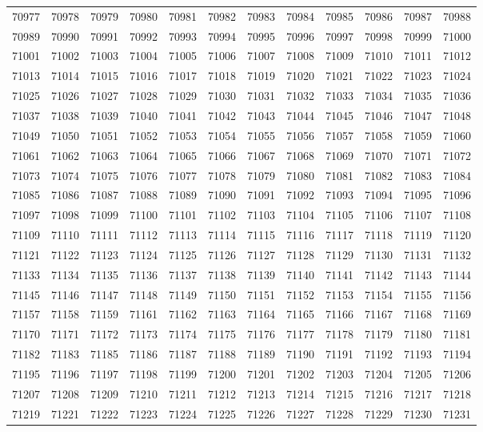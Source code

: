 \begin{center}
\begin{longtable}{llllllllllll}
70977 &70978 &70979 &70980 &70981 &70982 &70983 &70984 &70985 &70986 &70987 &70988 \\
70989 &70990 &70991 &70992 &70993 &70994 &70995 &70996 &70997 &70998 &70999 &71000 \\
71001 &71002 &71003 &71004 &71005 &71006 &71007 &71008 &71009 &71010 &71011 &71012 \\
71013 &71014 &71015 &71016 &71017 &71018 &71019 &71020 &71021 &71022 &71023 &71024 \\
71025 &71026 &71027 &71028 &71029 &71030 &71031 &71032 &71033 &71034 &71035 &71036 \\
71037 &71038 &71039 &71040 &71041 &71042 &71043 &71044 &71045 &71046 &71047 &71048 \\
71049 &71050 &71051 &71052 &71053 &71054 &71055 &71056 &71057 &71058 &71059 &71060 \\
71061 &71062 &71063 &71064 &71065 &71066 &71067 &71068 &71069 &71070 &71071 &71072 \\
71073 &71074 &71075 &71076 &71077 &71078 &71079 &71080 &71081 &71082 &71083 &71084 \\
71085 &71086 &71087 &71088 &71089 &71090 &71091 &71092 &71093 &71094 &71095 &71096 \\
71097 &71098 &71099 &71100 &71101 &71102 &71103 &71104 &71105 &71106 &71107 &71108 \\
71109 &71110 &71111 &71112 &71113 &71114 &71115 &71116 &71117 &71118 &71119 &71120 \\
71121 &71122 &71123 &71124 &71125 &71126 &71127 &71128 &71129 &71130 &71131 &71132 \\
71133 &71134 &71135 &71136 &71137 &71138 &71139 &71140 &71141 &71142 &71143 &71144 \\
71145 &71146 &71147 &71148 &71149 &71150 &71151 &71152 &71153 &71154 &71155 &71156 \\
71157 &71158 &71159 &71161 &71162 &71163 &71164 &71165 &71166 &71167 &71168 &71169 \\
71170 &71171 &71172 &71173 &71174 &71175 &71176 &71177 &71178 &71179 &71180 &71181 \\
71182 &71183 &71185 &71186 &71187 &71188 &71189 &71190 &71191 &71192 &71193 &71194 \\
71195 &71196 &71197 &71198 &71199 &71200 &71201 &71202 &71203 &71204 &71205 &71206 \\
71207 &71208 &71209 &71210 &71211 &71212 &71213 &71214 &71215 &71216 &71217 &71218 \\
71219 &71221 &71222 &71223 &71224 &71225 &71226 &71227 &71228 &71229 &71230 &71231 \\

\end{longtable}
\end{center}
